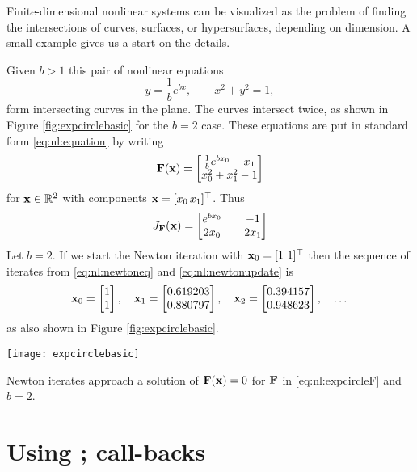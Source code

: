 Finite-dimensional nonlinear systems can be visualized as the problem of finding the intersections of curves, surfaces, or hypersurfaces, depending on dimension.  A small example gives us a start on the details.

\medskip\noindent\hrulefill
\begin{example}  Given $b > 1$ this pair of nonlinear equations
    $$y = \frac{1}{b} e^{bx}, \qquad x^2+y^2 = 1,$$
form intersecting curves in the plane.  The curves intersect twice, as shown in Figure \ref{fig:expcirclebasic} for the $b=2$ case.  These equations are put in standard form \eqref{eq:nl:equation} by writing
\begin{equation}
\label{eq:nl:expcircleF}
\mathbf{F}(\mathbf{x}) = \begin{bmatrix}
           \frac{1}{b} e^{b x_0} - x_1 \\
           x_0^2 + x_1^2 - 1
           \end{bmatrix}
\end{equation}
for $\mathbf{x}\in \mathbb{R}^2$ with components $\mathbf{x} = [x_0 \, x_1]^\top$.  Thus
\begin{equation}
\label{eq:nl:ecjacobian}
J_{\mathbf{F}}(\mathbf{x}) = \begin{bmatrix}
    e^{b x_0} & & -1 \\
    2 x_0   & & 2 x_1 \end{bmatrix}
\end{equation}
Let $b=2$.  If we start the Newton iteration with $\mathbf{x}_0 = [1 \,\, 1]^\top$ then the sequence of iterates from \eqref{eq:nl:newtoneq} and \eqref{eq:nl:newtonupdate} is
    $${\mathbf{x}}_{0} = \begin{bmatrix} 1 \\ 1 \end{bmatrix}, \quad {\mathbf{x}}_{1} = \begin{bmatrix} 0.619203 \\ 0.880797 \end{bmatrix}, \quad {\mathbf{x}}_{2} = \begin{bmatrix} 0.394157 \\ 0.948623 \end{bmatrix}, \quad \dots$$
as also shown in Figure \ref{fig:expcirclebasic}.

\begin{marginfigure}
\texttt{[image: expcirclebasic]}
\caption{Newton iterates approach a solution of $\mathbf{F}(\mathbf{x})=0$ for $\mathbf{F}$ in \eqref{eq:nl:expcircleF} and $b=2$.}
\label{fig:expcirclebasic}
\end{marginfigure}

\noindent\hrulefill
\end{example}


\section{Using \pSNES; call-backs} \label{sec:usingsnes}

